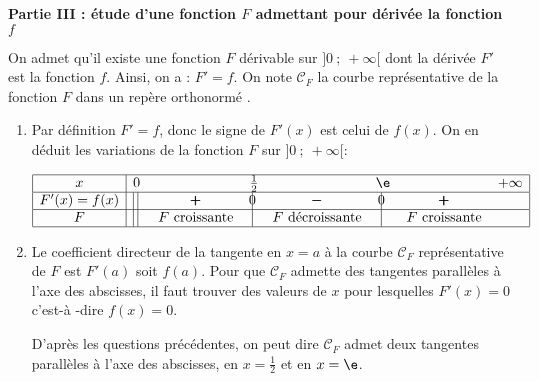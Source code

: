 \bigskip

\textbf{Partie III : étude d'une fonction \boldmath $F$\unboldmath{} admettant pour dérivée la fonction \boldmath $f$\unboldmath}

\medskip

On admet qu'il existe une fonction $F$ dérivable sur $]0~;~+\infty[$ dont la dérivée $F'$ est la fonction $f$.
Ainsi, on a : $F' = f$.
On note $\mathcal{C}_F$ la courbe représentative de la fonction $F$ dans un repère orthonormé \Oij. %

\begin{enumerate}
\item %
Par définition $F'= f$, donc le signe de $F'(x)$ est celui de $f(x)$. On en déduit les variations de la fonction $F$ sur $]0~;~ +\infty[$:

\begin{center}
{
\renewcommand{\arraystretch}{1.5}
\def\esp{\hspace*{2cm}}
$\begin{array}{|c |l *{6}{c} |} 
\hline
x  & 0 & \esp & \frac{1}{2} & \esp & \e & \esp & +\infty \\
\hline
F'(x)=f(x) & \vline\;\vline\; & \pmb{+} &  \vline\hspace{-2.7pt}{0} & \pmb{-} & \vline\hspace{-2.7pt}{0} & \pmb{+} &\\
\hline
F & \vline\;\vline\; & F \text{ croissante} &  \vline\hspace{-2.7pt}{\phantom 0} & F \text{ décroissante} & \vline\hspace{-2.7pt}{\phantom 0} & F \text{ croissante} &\\
\hline
\end{array}$
}
\end{center}
\item Le coefficient directeur de la tangente en $x=a$ à  la courbe $\mathcal{C}_F$ représentative  de $F$ est $F'(a)$ soit $f(a)$. Pour que $\mathcal{C}_F$ admette des tangentes parallèles à l'axe des abscisses, il faut trouver des valeurs de $x$ pour lesquelles $F'(x)=0$ c'est-à -dire $f(x)=0$.

D'après les questions précédentes, on peut dire  $\mathcal{C}_F$ admet deux tangentes parallèles à  l'axe des abscisses, en $x=\frac{1}{2}$ et en $x=\e$.
\end{enumerate}
